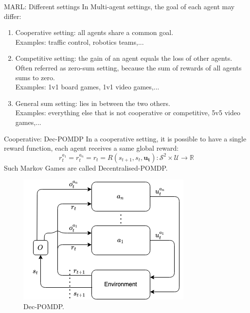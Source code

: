 \documentclass[9pt, hyperref={pdfusetitle,colorlinks=true,allcolors=DarkBlue}]{beamer}
\begin{document}
\begin{frame}{MARL: Different settings}
In Multi-agent settings, the goal of each agent may differ:
\vfill
\begin{enumerate}
    \item Cooperative setting: all agents share a common goal.
    \\Examples: traffic control, robotics teams,...
    \vfill
    \item Competitive setting: the gain of an agent equals the loss of other agents.
    \\Often referred as zero-sum setting, because the sum of rewards of all agents sums to zero.
    \\Examples: 1v1 board games, 1v1 video games,...
    \vfill
    \item General sum setting: lies in between the two others.
    \\Examples: everything else that is not cooperative or competitive, 5v5 video games,...
\end{enumerate}
\end{frame}

\begin{frame}[plain]{}
\end{frame}

\begin{frame}{Cooperative: Dec-POMDP}
In a cooperative setting, it is possible to have a single reward function, each agent receives a same global reward:
\begin{equation*}
    r^{a_1}_t = r^{a_n}_t=r_t = R(s_{t+1}, s_t, \boldsymbol{u_t}): \mathcal{S}^2 \times \mathcal{U} \rightarrow \mathbb{R}
\end{equation*}
Such Markov Games are called Decentralised-POMDP.
\begin{figure}
    \centering
    \includegraphics[scale=0.45]{dec-poMDP.png}
    \caption{Dec-POMDP.}

\end{figure}
\end{frame}
\end{document}
